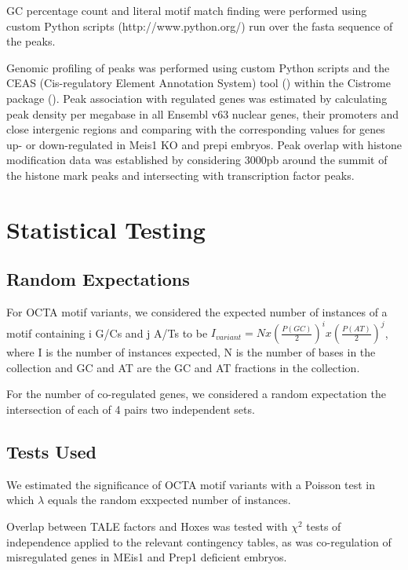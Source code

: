 GC percentage count and literal motif match finding were performed using custom Python scripts (http://www.python.org/) run over the fasta sequence of the peaks.

Genomic profiling of peaks was performed using custom Python scripts and the CEAS (Cis-regulatory Element Annotation System) tool (\cite{Shin2009}) within the Cistrome package (\cite{Liu2011}). Peak association with regulated genes was estimated by calculating peak density per megabase in all Ensembl v63 nuclear genes, their promoters and close intergenic regions and comparing with the corresponding values for genes up- or down-regulated in Meis1 \ac{KO} and \ac{prepi} embryos. Peak overlap with histone modification data was established by considering 3000pb around the summit of the histone mark peaks and intersecting with transcription factor peaks.

\section{Statistical Testing}

\subsection{Random Expectations}

For \ac{OCTA} motif variants, we considered the expected number of instances of a motif containing i G/Cs and j A/Ts to be $I_{variant} = N x {\left(\frac{P(GC)}{2}\right)}^i x {\left(\frac{P(AT)}{2}\right)}^j$, where I is the number of instances expected, N is the number of bases in the collection and GC and AT are the GC and AT fractions in the collection.

For the number of co-regulated genes, we considered a random expectation the intersection of each of 4 pairs two independent sets. 

\subsection{Tests Used}

We estimated the significance of OCTA motif variants with a Poisson test in which $\lambda$ equals the random exxpected number of instances.

Overlap between \ac{TALE} factors and Hoxes was tested with $\chi^2$ tests of independence applied to the relevant contingency tables, as was co-regulation of misregulated genes in MEis1 and Prep1 deficient embryos.


